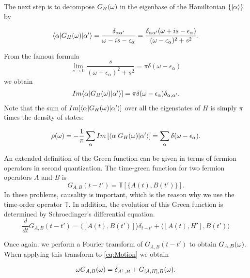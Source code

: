 The next step is to decompose $G_{H}(\omega)$ in the eigenbase of the Hamiltonian $\{\vert \alpha \rangle\}$  by 


\begin{equation}
    \langle \alpha  \vert G_{H}(\omega)\vert \alpha' \rangle=\frac{\delta_{\alpha\alpha'}}{\omega - is -\epsilon_\alpha}=\frac{\delta_{\alpha\alpha'}(\omega + is -\epsilon_\alpha)}{(\omega-\epsilon_{\alpha})^{2}+s^{2}}.
\end{equation}

From the famous formula 
\begin{equation}
\lim_{s\rightarrow0}\frac{s}{(\omega-\epsilon_{\alpha})^{2}+s^{2}}=\pi\delta(\omega-\epsilon_{\alpha})
\end{equation}
we obtain 
\begin{equation}
    Im \langle \alpha  \vert G_{H}(\omega)\vert \alpha' \rangle] = \pi \delta(\omega -\epsilon_\alpha)\delta_{\alpha,\alpha'}.
\end{equation}
Note that the sum of $Im[ \langle \alpha  \vert G_{H}(\omega)\vert \alpha' \rangle]$ over all the eigenstates of $H$ is simply $\pi$ times the density of states:

\begin{equation}
    \rho(\omega)=-\frac{1}{\pi} \sum_\alpha Im \left[ \langle \alpha  \vert G_{H}(\omega)\vert \alpha' \rangle\right] = \sum_\alpha \delta(\omega-\epsilon_\alpha) . \label{eq:DOS_def}
\end{equation}

An extended definition of the Green function  can be given in terms of fermion operators in second quantization.  The time-green function for two fermion operators $A$ and $B$ is
\begin{equation}
  G_{A,B}(t-t') = \mathbb{T}[\{ A(t),B(t') \} ]. \label{eq:TempGreen}
\end{equation}
In these problems, causality is important, which is the reason why we use the time-order operator $\mathbb{T}$.  In addition, the evolution of this Green function is determined by Schroedinger's differential equation. 
\begin{equation}
\frac{d}{dt}G_{A,B}\left(t-t'\right)=\langle\left[A(t),B(t')\right]\rangle\delta_{t-t'}+\langle\left[A(t),H'\right],B(t')\rangle
\label{eq:Motion}
\end{equation}

Once again, we perform a Fourier transform of $G_{A,B}(t-t') $ to obtain $G_{A,B}(\omega)$. When applying this transform to \ref{eq:Motion} we obtain 

\begin{equation}
    \omega G_{A,B}(\omega)=\delta_{A^{\dagger},B}+G_{\left[A,H\right],B}(\omega).
    \label{eq:Transport}
\end{equation}


